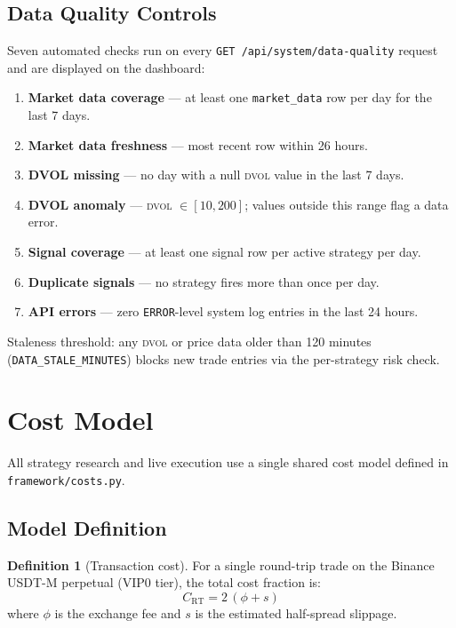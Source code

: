 \documentclass[12pt, a4paper]{article}
\theoremstyle{definition}
\newtheorem{defn}{Definition}[section]
\newcommand{\DVOL}{\textsc{dvol}}
\begin{document}
\subsection{Data Quality Controls}

Seven automated checks run on every \texttt{GET /api/system/data-quality}
request and are displayed on the dashboard:

\begin{enumerate}[leftmargin=2em]
    \item \textbf{Market data coverage} — at least one \texttt{market\_data} row per day for the last 7 days.
    \item \textbf{Market data freshness} — most recent row within 26 hours.
    \item \textbf{DVOL missing} — no day with a null \DVOL{} value in the last 7 days.
    \item \textbf{DVOL anomaly} — \DVOL{} $\in [10, 200]$; values outside this range flag a data error.
    \item \textbf{Signal coverage} — at least one signal row per active strategy per day.
    \item \textbf{Duplicate signals} — no strategy fires more than once per day.
    \item \textbf{API errors} — zero \texttt{ERROR}-level system log entries in the last 24 hours.
\end{enumerate}

Staleness threshold: any \DVOL{} or price data older than 120 minutes
(\texttt{DATA\_STALE\_MINUTES}) blocks new trade entries via the per-strategy
risk check.

\section{Cost Model}

All strategy research and live execution use a single shared cost model
defined in \texttt{framework/costs.py}.

\subsection{Model Definition}

\begin{defn}[Transaction cost]
For a single round-trip trade on the Binance USDT-M perpetual (VIP0 tier),
the total cost fraction is:
\begin{equation}
    C_{\text{RT}} = 2\,(\phi + s)
    \label{eq:round_trip_cost}
\end{equation}
where $\phi$ is the exchange fee and $s$ is the estimated half-spread slippage.
\end{defn}
\end{document}

